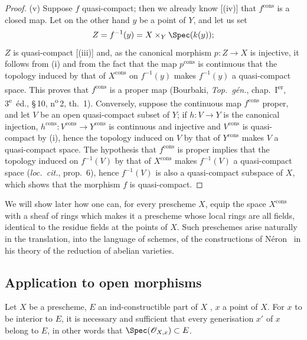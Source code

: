 \begin{proof}
(v) Suppose $f$ quasi-compact; then we already know [(iv)] that $f^{\mathrm{cons}}$ is a closed map.
Let on the other hand $y$ be a point of $Y$, and let us set
\[
  Z=f^{-1}(y)=X\times_Y\Spec(k(y));
\]
$Z$ is quasi-compact [(iii)] and, as the canonical morphism $p:Z\to X$ is injective, it follows from (i) and from the fact that the map $p^{\mathrm{cons}}$ is continuous that the topology induced by that of $X^{\mathrm{cons}}$ on $f^{-1}(y)$ makes $f^{-1}(y)$ a quasi-compact space.
This proves that $f^{\mathrm{cons}}$ is a proper map (Bourbaki, \emph{Top.\ g\'{e}n.}, chap.~I\textsuperscript{er}, 3\textsuperscript{e}~\'{e}d., \S\,10, n\textsuperscript{o}\,2, th.~1).
Conversely, suppose the continuous map $f^{\mathrm{cons}}$ proper, and let $V$ be an open quasi-compact subset of $Y$; if $h:V\to Y$ is the canonical injection, $h^{\mathrm{cons}}:V^{\mathrm{cons}}\to Y^{\mathrm{cons}}$ is continuous and injective and $V^{\mathrm{cons}}$ is quasi-compact by (i), hence the topology induced on $V$ by that of $Y^{\mathrm{cons}}$ makes $V$ a quasi-compact space.
The hypothesis that $f^{\mathrm{cons}}$ is proper implies that the topology induced on $f^{-1}(V)$ by that of $X^{\mathrm{cons}}$ makes $f^{-1}(V)$ a quasi-compact space (\emph{loc.\ cit.}, prop.~6), hence $f^{-1}(V)$ is also a quasi-compact subspace of $X$, which shows that the morphism $f$ is quasi-compact.
\end{proof}

\begin{env}[1.9.16]
\label{IV.1.9.16}
We will show later how one can, for every prescheme $X$, equip the space $X^{\mathrm{cons}}$ with a sheaf of rings which makes it a prescheme whose local rings are all fields, identical to the residue fields at the points of $X$.
Such preschemes arise naturally in the translation, into the language of schemes, of the constructions of N\'{e}ron~\cite{IV-32} in his theory of the reduction of abelian varieties.
\end{env}


\subsection{Application to open morphisms}
\label{subsection:IV.1.10}

\begin{theorem}[1.10.1]
\label{IV.1.10.1}
Let $X$ be a prescheme, $E$ an ind-constructible part of $X$ , $x$ a point of $X$.
For $x$ to be interior to $E$, it is necessary and sufficient that every generisation  $x'$ of $x$ belong to $E$, in other words  that $\Spec(\mathcal{O}_{X,x})\subset E$.
\end{theorem}

